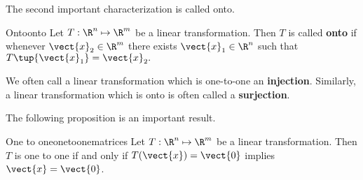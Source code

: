 The second important characterization is called onto.

\begin{definition}{Onto}{onto}
Let $T: \R^n \mapsto \R^m$ be a linear transformation. Then $T$ is called \textbf{onto} if whenever $\vect{x}_2 \in \R^{m}$ there exists 
$\vect{x}_1 \in \R^{n}$ such that $T\tup{\vect{x}_1} = \vect{x}_2. $
\end{definition}

We often call a linear transformation which is one-to-one an \textbf{injection}. Similarly, a linear transformation which is onto is often called a \textbf{surjection}.

The following proposition is an important result. 

\begin{proposition}{One to one}{onetoonematrices}
Let $T:\R^n \mapsto \R^m$ be a linear transformation. Then $T$ is one to one if
and only if $T(\vect{x}) = \vect{0}$ implies $\vect{x}=\vect{0}$.
\end{proposition}

